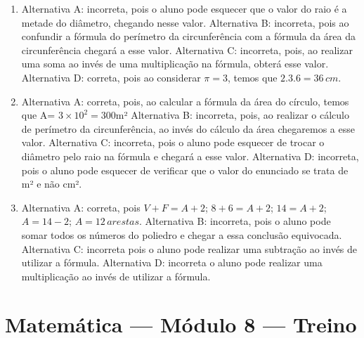 \begin{enumerate}
\item Alternativa A: incorreta, pois o aluno pode esquecer que o valor do raio
é a metade do diâmetro, chegando nesse valor.
Alternativa B: incorreta, pois ao confundir a fórmula do perímetro da
circunferência com a fórmula da área da circunferência chegará a esse
valor.
Alternativa C: incorreta, pois, ao realizar uma soma ao invés de uma
multiplicação na fórmula, obterá esse valor.
Alternativa D: correta, pois ao considerar $\pi = 3$, temos que $2.3.6 = 36\,cm$.

\item Alternativa A: correta, pois, ao calcular a fórmula da área do círculo,
temos que A= $3\times 10^2 = 300$m²
Alternativa B: incorreta, pois, ao realizar o cálculo de perímetro da
circunferência, ao invés do cálculo da área chegaremos a esse valor.
Alternativa C: incorreta, pois o aluno pode esquecer de trocar o
diâmetro pelo raio na fórmula e chegará a esse valor.
Alternativa D: incorreta, pois o aluno pode esquecer de verificar que o
valor do enunciado se trata de m² e não cm².

\item Alternativa A: correta, pois $V + F = A + 2$; $8 + 6 = A + 2$; $14 = A + 2$; $A = 14 - 2$; $A = 12\,arestas$.
Alternativa B: incorreta, pois o aluno pode somar todos os números do
poliedro e chegar a essa conclusão equivocada.
Alternativa C: incorreta pois o aluno pode realizar uma subtração ao
invés de utilizar a fórmula.
Alternativa D: incorreta o aluno pode realizar uma multiplicação ao
invés de utilizar a fórmula.
\end{enumerate}

\section*{Matemática — Módulo 8 — Treino}

